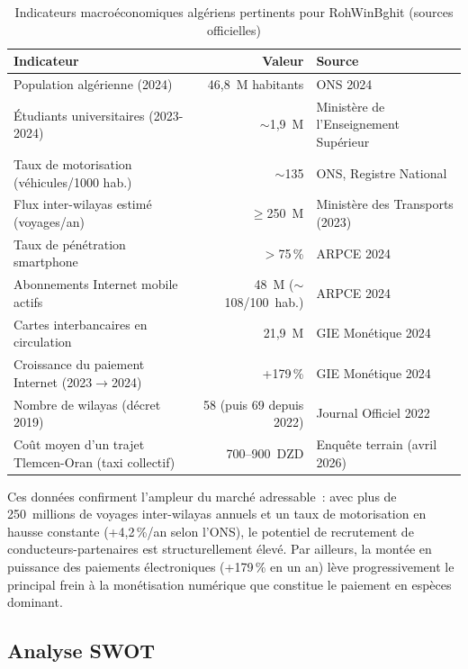 \documentclass[12pt, a4paper, oneside]{report}
\begin{document}
\begin{table}[H]
\centering
\footnotesize
\begin{tabularx}{\textwidth}{|X|r|l|}
\hline
\rowcolor{rohlight}
\textbf{Indicateur} & \textbf{Valeur} & \textbf{Source} \\
\hline
Population algérienne (2024) & 46,8~M habitants & ONS 2024 \\
\hline
Étudiants universitaires (2023-2024) & $\sim$1,9~M & Ministère de l'Enseignement Supérieur \\
\hline
Taux de motorisation (véhicules/1000 hab.) & $\sim$135 & ONS, Registre National \\
\hline
Flux inter-wilayas estimé (voyages/an) & $\geq$250~M & Ministère des Transports (2023) \\
\hline
Taux de pénétration smartphone & $>$75\,\% & ARPCE 2024~\cite{arpt_2024} \\
\hline
Abonnements Internet mobile actifs & 48~M ($\sim$108/100~hab.) & ARPCE 2024~\cite{arpt_2024} \\
\hline
Cartes interbancaires en circulation & 21,9~M & GIE Monétique 2024~\cite{gie_monetique_2024} \\
\hline
Croissance du paiement Internet (2023$\rightarrow$2024) & +179\,\% & GIE Monétique 2024~\cite{gie_monetique_2024} \\
\hline
Nombre de wilayas (décret 2019) & 58 (puis 69 depuis 2022) & Journal Officiel 2022 \\
\hline
Coût moyen d'un trajet Tlemcen-Oran (taxi collectif) & 700--900~DZD & Enquête terrain (avril 2026) \\
\hline
\end{tabularx}
  \caption{Indicateurs macroéconomiques algériens pertinents pour RohWinBghit (sources officielles)}
  \label{tab:macro-algerie}
\end{table}

Ces données confirment l'ampleur du marché adressable~: avec plus de 250~millions de voyages inter-wilayas annuels et un taux de motorisation en hausse constante (+4,2\,\%/an selon l'ONS), le potentiel de recrutement de conducteurs-partenaires est structurellement élevé. Par ailleurs, la montée en puissance des paiements électroniques (+179\,\% en un an) lève progressivement le principal frein à la monétisation numérique que constitue le paiement en espèces dominant.

\subsection{Analyse SWOT}
\end{document}

